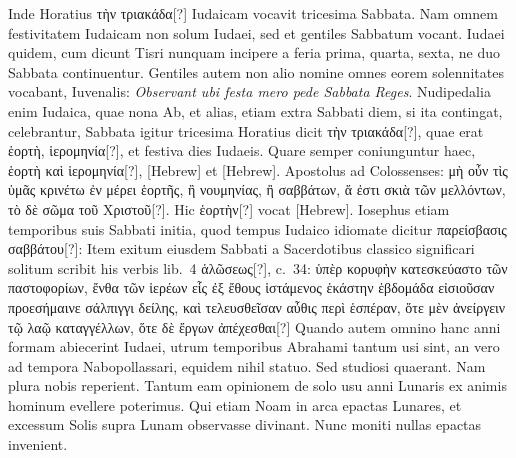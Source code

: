 Inde Horatius \textgreek{τὴν τριακάδα}[?] Iudaicam
vocavit tricesima Sabbata.
Nam omnem festivitatem Iudaicam
non solum Iudaei, sed et gentiles Sabbatum vocant.
Iudaei
quidem, cum dicunt Tisri nunquam incipere a feria prima,
quarta, sexta, ne duo Sabbata continuentur.
Gentiles autem
non alio nomine omnes eorem solennitates vocabant, Iuvenalis:
\textit{Observant ubi festa mero pede Sabbata Reges}.
Nudipedalia
enim Iudaica, quae nona Ab, et alias, etiam extra
Sabbati diem, si ita contingat, celebrantur, Sabbata igitur tricesima
Horatius dicit \textgreek{τὴν τριακάδα}[?],
 quae erat \textgreek{ἑορτὴ, ἱερομηνία}[?], et
festiva dies Iudaeis.
Quare semper coniunguntur haec, \textgreek{ἑορτὴ καὶ ἱερομηνία}[?],
\texthebrew{}[Hebrew] et \texthebrew{}[Hebrew].
%
Apostolus ad Colossenses:
 \textgreek{μὴ οὖν τὶς ὑμᾶς κρινέτω ἐν μέρει
ἑορτῆς, ἢ νουμηνίας, ἢ σαββάτων, ἅ ἐστι σκιὰ τῶν μελλόντων, τὸ δὲ σῶμα τοῦ
Χριστοῦ}[?].
Hic \textgreek{ἑορτὴν}[?] vocat \texthebrew{}[Hebrew].
Iosephus etiam temporibus suis Sabbati
initia, quod tempus Iudaico idiomate dicitur
 \textgreek{παρείσβασις σαββάτου}[?]:
Item exitum eiusdem Sabbati a Sacerdotibus classico significari
solitum scribit his verbis lib.\ 4 \textgreek{ἁλῶσεως}[?], c.\ 34:
 \textgreek{ὑπὲρ κορυφὴν κατεσκεύαστο
τῶν παστοφορίων, ἔνθα τῶν ἱερέων εἷς ἐξ ἔθους ἱστάμενος ἑκάστην ἑβδομάδα
εἰσιοῦσαν προεσήμαινε σάλπιγγι δείλης, καὶ τελευσθεῖσαν αὖθις περὶ ἑσπέραν,
ὅτε μὲν ἀνείργειν τῷ λαῷ καταγγέλλων, ὅτε δὲ ἔργων ἀπέχεσθαι}[?]
Quando
autem omnino hanc anni formam abiecerint Iudaei, utrum temporibus
Abrahami tantum usi sint, an vero ad tempora Nabopollassari,
equidem nihil statuo.
Sed studiosi quaerant.
Nam plura nobis
reperient.
Tantum eam opinionem de solo usu anni Lunaris ex animis
hominum evellere poterimus.
Qui etiam Noam in arca epactas
Lunares, et excessum Solis supra Lunam observasse divinant.
Nunc
moniti nullas epactas invenient.
%

